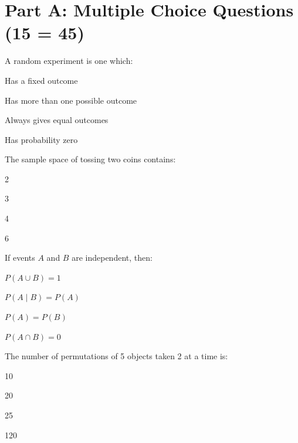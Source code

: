\documentclass{USTBExam}
\begin{document}
\maketitle

\section{Part A: Multiple Choice Questions (15  = 45)}

\begin{question}
A random experiment is one which:
\paren
\begin{choices}
\item Has a fixed outcome
\item Has more than one possible outcome
\item Always gives equal outcomes
\item Has probability zero
\end{choices}
\end{question}

\begin{question}
The sample space of tossing two coins contains:
\paren
\begin{choices}
\item 2
\item 3
\item 4
\item 6
\end{choices}
\end{question}

\begin{question}
If events $A$ and $B$ are independent, then:
\paren
\begin{choices}
\item $P(A \cup B)=1$
\item $P(A\mid B)=P(A)$
\item $P(A)=P(B)$
\item $P(A\cap B)=0$
\end{choices}
\end{question}

\begin{question}
The number of permutations of 5 objects taken 2 at a time is:
\paren
\begin{choices}
\item 10
\item 20
\item 25
\item 120
\end{choices}
\end{question}
\end{document}
